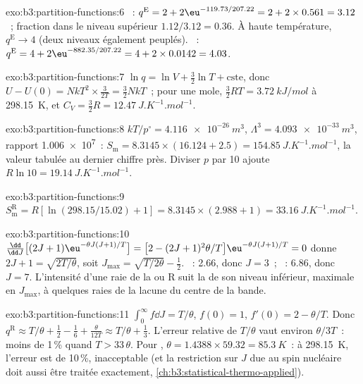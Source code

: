 \begin{solution}{exo:b3:partition-functions:6}
~: $q^{\mathrm E} = 2 + 2\eu^{-119.73/207.22} = 2 + 2 \times 0.561 = 3.12$~;
fraction dans le niveau supérieur $1.12/3.12
= 0.36$. À haute température, $q^{\mathrm E} \to 4$ (deux niveaux
également peuplés). ~:
$q^{\mathrm E} = 4 + 2\eu^{-882.35/207.22} = 4 + 2 \times 0.0142 = 4.03$.
\end{solution}

\begin{solution}{exo:b3:partition-functions:7}
$\ln q = \ln V + \frac32\ln T + \text{cste}$, donc $U - U(0) = NkT^2 \times \frac{3}{2T} = \frac32NkT$~;
pour une mole, $\frac32RT = \qty{3.72}{kJ/mol}$ à \qty{298.15}{K}, et $C_V = \frac32R = \qty{12.47}{J.K^{-1}.mol^{-1}}$.
\end{solution}

\begin{solution}{exo:b3:partition-functions:8}
$kT/p^\circ = \qty{4.116e-26}{m^3}$, $\Lambda^3 = \qty{4.093e-33}{m^3}$, rapport \num{1.006e7}~:
$S_{\mathrm m} = 8.3145 \times (16.124 + 2.5) = \qty{154.85}{J.K^{-1}.mol^{-1}}$,
la valeur tabulée au dernier chiffre près. Diviser $p$ par 10 ajoute
$R\ln10 = \qty{19.14}{J.K^{-1}.mol^{-1}}$.
\end{solution}

\begin{solution}{exo:b3:partition-functions:9}
$S^{\mathrm R}_{\mathrm m} = R[\ln(298.15/15.02) + 1] = 8.3145 \times (2.988 + 1) = \qty{33.16}{J.K^{-1}.mol^{-1}}$.
\end{solution}

\begin{solution}{exo:b3:partition-functions:10}
$\frac{\dd}{\dd J}\bigl[(2J+1)\eu^{-\theta J(J+1)/T}\bigr] = \bigl[2 - (2J+1)^2\theta/T\bigr]\eu^{-\theta J(J+1)/T} = 0$ donne
$2J + 1 = \sqrt{2T/\theta}$, soit $J_{\max} = \sqrt{T/2\theta} - \frac12$. ~: 2.66, donc $J = 3$~; ~:
6.86, donc $J = 7$. L'intensité d'une raie de la  ou R suit la
 de son niveau inférieur, maximale en $J_{\max}$, à quelques
raies de la lacune du centre de la bande.
\end{solution}

\begin{solution}{exo:b3:partition-functions:11}
$\int_0^\infty f\dd J = T/\theta$, $f(0) = 1$, $f'(0) = 2 - \theta/T$. Donc $q^{\mathrm R} \approx T/\theta + \frac12 -
\frac16 + \frac{\theta}{12T} \approx T/\theta + \frac13$. L'erreur
relative de $T/\theta$ vaut environ $\theta/3T$~:
moins de 1\,\% quand $T > 33\,\theta$. Pour , $\theta = 1.4388 \times 59.32 = \qty{85.3}{K}$~:
à \qty{298.15}{K}, l'erreur est de 10\,\%, inacceptable (et la
restriction sur $J$ due au spin nucléaire doit aussi être traitée
exactement, \cref{ch:b3:statistical-thermo-applied}).
\end{solution}

